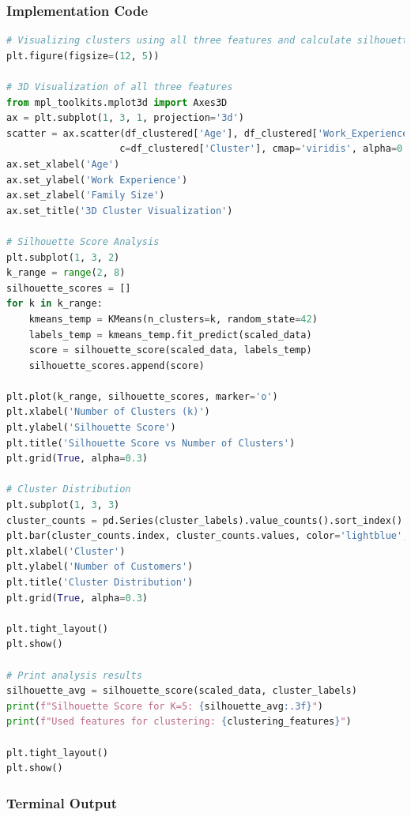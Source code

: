 \documentclass[12pt,a4paper]{article}
\begin{document}
\subsubsection{Implementation Code}
\begin{lstlisting}[language=Python, caption=Cluster Visualization and Silhouette Analysis]
# Visualizing clusters using all three features and calculate silhouette score
plt.figure(figsize=(12, 5))

# 3D Visualization of all three features
from mpl_toolkits.mplot3d import Axes3D
ax = plt.subplot(1, 3, 1, projection='3d')
scatter = ax.scatter(df_clustered['Age'], df_clustered['Work_Experience'], df_clustered['Family_Size'],
                    c=df_clustered['Cluster'], cmap='viridis', alpha=0.7)
ax.set_xlabel('Age')
ax.set_ylabel('Work Experience')
ax.set_zlabel('Family Size')
ax.set_title('3D Cluster Visualization')

# Silhouette Score Analysis
plt.subplot(1, 3, 2)
k_range = range(2, 8)
silhouette_scores = []
for k in k_range:
    kmeans_temp = KMeans(n_clusters=k, random_state=42)
    labels_temp = kmeans_temp.fit_predict(scaled_data)
    score = silhouette_score(scaled_data, labels_temp)
    silhouette_scores.append(score)

plt.plot(k_range, silhouette_scores, marker='o')
plt.xlabel('Number of Clusters (k)')
plt.ylabel('Silhouette Score')
plt.title('Silhouette Score vs Number of Clusters')
plt.grid(True, alpha=0.3)

# Cluster Distribution
plt.subplot(1, 3, 3)
cluster_counts = pd.Series(cluster_labels).value_counts().sort_index()
plt.bar(cluster_counts.index, cluster_counts.values, color='lightblue', alpha=0.8)
plt.xlabel('Cluster')
plt.ylabel('Number of Customers')
plt.title('Cluster Distribution')
plt.grid(True, alpha=0.3)

plt.tight_layout()
plt.show()

# Print analysis results
silhouette_avg = silhouette_score(scaled_data, cluster_labels)
print(f"Silhouette Score for K=5: {silhouette_avg:.3f}")
print(f"Used features for clustering: {clustering_features}")

plt.tight_layout()
plt.show()
\end{lstlisting}

\newpage
\subsubsection{Terminal Output}
\end{document}
